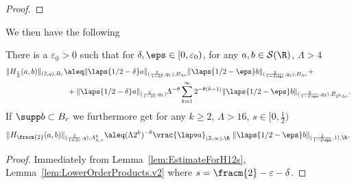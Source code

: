 \begin{proof}
\end{proof}


We then have the following
\begin{lemma}\label{lem:localizedHEst}
There is a $\varepsilon_{0} > 0$ such that
for $\delta,\eps\in[0,\varepsilon_{0})$,
for any $a,b\in\mathcal S(\R)$, $\Lambda>4$
\begin{align*}
    &\|H_{\frac{1}{2}}(a,b)\|_{(2, q), B_r} 
  \aleq \|\laps{1/2-\delta} a\|_{(\frac2{1-2\delta},q_1),B_{\Lambda r}} \|\laps{1/2-\eps} b\|_{(\frac2{1-2\eps},q_2),B_{\Lambda r}} + \\
  &\qquad\qquad\qquad\qquad{}+\|\laps{1/2-\delta} a\|_{(\frac2{1-2\delta},q_1)} \Lambda^{-\theta}
    \sum_{k=1}^\infty 2^{-\theta(k-1)}\|\laps{1/2-\eps} b\|_{(\frac2{1-2\eps},q_2),B_{2^k\Lambda r}}.
 \end{align*}
If $\supp b \subset B_r$ we furthermore get for any $k \geq 2$, $\Lambda > 16$, $s\in[0,\frac12)$
 \begin{equation*}
  \|H_{\fracm{2}}(a,b)\|_{(\frac2{1+2s},q),A^k_{\Lambda,r}} \aleq (\Lambda 2^k)^{-\theta} \vrac{\lapv a}_{(2,\infty),\R}\ \|\laps{1/2-\eps} b \|_{(\frac 2 {1-2\eps}, 1),\R}.
 \end{equation*}
 \end{lemma}
 
\begin{proof}
Immediately from Lemma~\ref{lem:EstimateForH12s}, Lemma~\ref{lem:LowerOrderProducts.v2} where $s = \fracm{2} - \varepsilon - \delta$. 
\end{proof}


